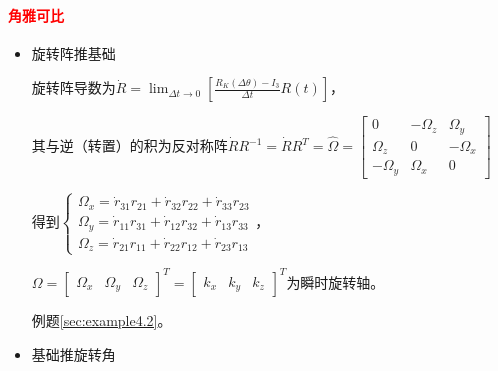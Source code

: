 \documentclass[
12pt, %
a4paper, 
oneside, %
]{scrartcl}
\begin{document}
\paragraph{\textcolor{red}{角雅可比}}
\begin{itemize}
\item 旋转阵推基础\label{sec:Rotation_matrix}

旋转阵导数为$ \dot{R} = \lim_{\Delta t \to 0}[\frac{R_K(\Delta \theta) - I_3}{\Delta t} R(t)] $，

其与逆（转置）的积为反对称阵$ \dot{R} R^{-1} = \dot{R} R^T = \hat{\Omega} = \begin{bmatrix} 0 & -\Omega_z & \Omega_y \\ \Omega_z & 0 & -\Omega_x \\ -\Omega_y & \Omega_x & 0 \end{bmatrix} $

得到$ \begin{cases} \Omega_x = \dot{r}_{31} r_{21} + \dot{r}_{32} r_{22} + \dot{r}_{33} r_{23} \\ \Omega_y = \dot{r}_{11} r_{31} + \dot{r}_{12} r_{32} + \dot{r}_{13} r_{33} \\ \Omega_z = \dot{r}_{21} r_{11} + \dot{r}_{22} r_{12} + \dot{r}_{23} r_{13} \end{cases} $，

$ \Omega = \begin{bmatrix} \Omega_x & \Omega_y & \Omega_z \end{bmatrix}^T = \begin{bmatrix} k_x & k_y & k_z \end{bmatrix}^T $为瞬时旋转轴。

例题\ref{sec:example4.2}。
\item 基础推旋转角


\end{itemize}
\end{document}
